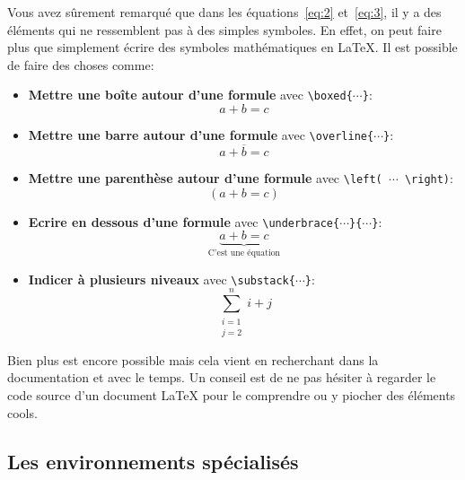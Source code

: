 Vous avez sûrement remarqué que dans les équations~\eqref{eq:2} et~\eqref{eq:3},
il y a des éléments qui ne ressemblent pas à des simples symboles. En effet,
on peut faire plus que simplement écrire des symboles mathématiques en LaTeX.
Il est possible de faire des choses comme:
\begin{itemize}
    \item \textbf{Mettre une boîte autour d'une formule} avec \texttt{\textbackslash{}boxed\{\(\cdots\)\}}:
    \begin{equation}
        \boxed{a + b = c}
    \end{equation}
    \item \textbf{Mettre une barre autour d'une formule} avec \texttt{\textbackslash{}overline\{\(\cdots\)\}}:
    \begin{equation}
        \overline{a + b = c}
    \end{equation}
    \item \textbf{Mettre une parenthèse autour d'une formule} avec \texttt{\textbackslash{}left( \(\cdots\) \textbackslash{}right)}:
    \begin{equation}
        \left( a + b = c \right)
    \end{equation}
    \item \textbf{Ecrire en dessous d'une formule} avec \texttt{\textbackslash{}underbrace\{\(\cdots\)\}\textunderscore\{\(\cdots\)\}}:
    \begin{equation}
        \underbrace{a + b = c}_{\text{C'est une équation}}
    \end{equation}
    \item \textbf{Indicer à plusieurs niveaux} avec \texttt{\textbackslash{}substack\{\(\cdots\)\}}:
    \begin{equation}
        \sum_{\substack{i=1 \\ j=2}}^{n} i + j
    \end{equation}
\end{itemize}

Bien plus est encore possible mais cela vient en recherchant dans la documentation
et avec le temps. Un conseil est de ne pas hésiter à regarder le code source
d'un document LaTeX pour le comprendre ou y piocher des éléments cools.

\subsection{Les environnements spécialisés}\label{subsec:latex_math_env}

